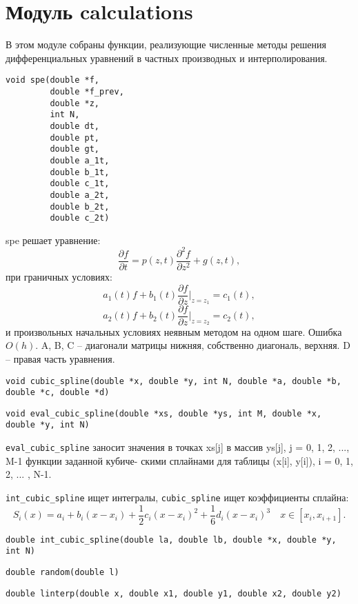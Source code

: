 \section{Модуль calculations}

В этом модуле собраны функции, реализующие численные методы решения дифференциальных уравнений в частных производных и интерполирования.

\begin{verbatim}
void spe(double *f,
         double *f_prev,
         double *z,
         int N,
         double dt,
         double pt,
         double gt,
         double a_1t,
         double b_1t,
         double c_1t,
         double a_2t,
         double b_2t,
         double c_2t)
\end{verbatim}

spe решает уравнение:
\[
        \frac{\partial f}{\partial t} =
        p(z, t) \frac{\partial^2 f}{\partial z^2} + g(z, t),
\]
при граничных условиях:
\[
        a_1(t) f + b_1(t) \frac{\partial f}{\partial z} \Bigg|_{z = z_
1} = c_1(t),
\]
\[
        a_2(t) f + b_2(t) \frac{\partial f}{\partial z} \Bigg|_{z = z_
2} = c_2(t),
\]
и произвольных начальных условиях неявным методом на одном шаге. Ошибка $O(h)$. A, B, C -- диагонали матрицы нижняя, собственно диагональ, верхняя. D -- правая часть уравнения.

\begin{verbatim}
void cubic_spline(double *x, double *y, int N, double *a, double *b, double *c, double *d)
\end{verbatim}

\begin{verbatim}
void eval_cubic_spline(double *xs, double *ys, int M, double *x, double *y, int N)
\end{verbatim}

\verb+eval_cubic_spline+ заносит значения в точках xs[j] в массив ys[j], j = 0,
1, 2, ..., M-1 функции заданной кубиче-
скими сплайнами для таблицы (x[i], y[i]), i = 0, 1, 2, ... , N-1. 

\verb+int_cubic_spline+ ищет интегралы, \verb+cubic_spline+ ищет коэффициенты сплайна:
\[
    S_i(x) = a_i + b_i (x - x_i) + \frac{1}{2} c_i (x - x_i)^2 + \frac{1}{6} d_i (x - x_i)^3
    \quad x\in[x_i, x_{i+1}].
\]


\begin{verbatim}
double int_cubic_spline(double la, double lb, double *x, double *y, int N)
\end{verbatim}

\begin{verbatim}
double random(double l)
\end{verbatim}

\begin{verbatim}
double linterp(double x, double x1, double y1, double x2, double y2)
\end{verbatim}
